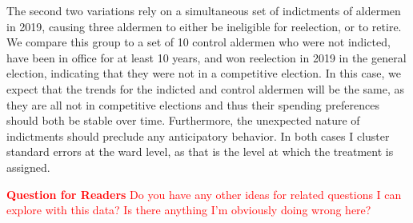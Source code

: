 The second two variations rely on a simultaneous set of indictments of aldermen in 2019, causing three aldermen to either be ineligible for reelection, or to retire. 
We compare this group to a set of 10 control aldermen who were not indicted, have been in office for at least 10 years, and won reelection in 2019 in the general election, indicating that they were not in a competitive election. 
In this case, we expect that the trends for the indicted and control aldermen will be the same, as they are all not in competitive elections and thus their spending preferences should both be stable over time.
Furthermore, the unexpected nature of indictments should preclude any anticipatory behavior.
In both cases I cluster standard errors at the ward level, as that is the level at which the treatment is assigned.

\textcolor{red}{\textbf{Question for Readers} Do you have any other ideas for related questions I can explore with this data? Is there anything I'm obviously doing wrong here?}
